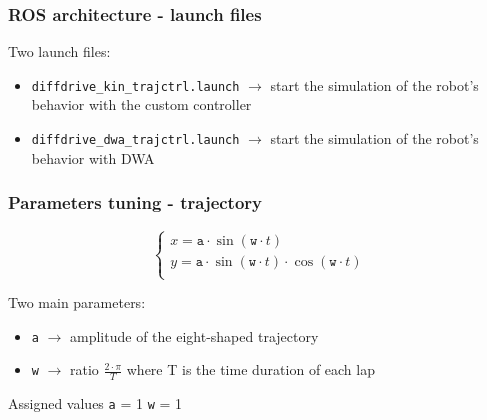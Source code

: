 \documentclass{beamer}
\begin{document}
\begin{frame}
\frametitle{ROS architecture - launch files}

Two launch files:
\begin{itemize}
  \item \texttt{diffdrive\_kin\_trajctrl.launch} $\rightarrow$ start the simulation of the robot's behavior with the custom controller
  \item \texttt{diffdrive\_dwa\_trajctrl.launch} $\rightarrow$ start the simulation of the robot's behavior with DWA
\end{itemize}


\end{frame}


\begin{frame}
\frametitle{Parameters tuning - trajectory}

$$
\begin{cases}
    x = \texttt{a} \cdot \sin (\texttt{w} \cdot t)\\
    y = \texttt{a} \cdot \sin (\texttt{w} \cdot t)\cdot \cos (\texttt{w} \cdot t)\\
\end{cases}
$$

\vspace{2em}

Two main parameters:
\begin{itemize}
 \item \texttt{a} $\rightarrow$ amplitude of the eight-shaped trajectory
 \item \texttt{w} $\rightarrow$ ratio $\frac{2 \cdot \pi}{T}$ where T is the time duration of each lap
\end{itemize}

\vspace{2em}

\begin{block}{Assigned values}
\centering
\texttt{a} = 1
\hspace{3em}
\texttt{w} = 1
\end{block}

\end{frame}

\end{document}
